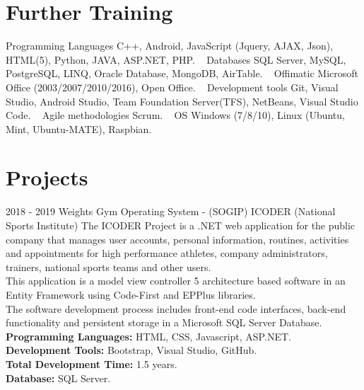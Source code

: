 \documentclass[]{friggeri-cv}
\begin{document}
\section{Further Training}
\begin{entrylist}
    \entry
    {}
    {Programming Languages}
    {}
    {C++, Android, JavaScript (Jquery, AJAX, Json), HTML(5), Python, JAVA, ASP.NET, PHP.}
    ~
    \entry
    {}
    {Databases}
    {}
    {SQL Server, MySQL, PostgreSQL, LINQ, Oracle Database, MongoDB, AirTable.}
    ~
    \entry
    {}
    {Offimatic}
    {}
    {Microsoft Office (2003/2007/2010/2016), Open Office.}
    ~
    \entry
    {}
    {Development tools}
    {}
    {Git, Visual Studio, Android Studio, Team Foundation Server(TFS), NetBeans, Visual Studio Code.}
    ~
    \entry
    {}
    {Agile methodologies}
    {}
    {Scrum.}
    ~
    \entry
    {}
    {OS}
    {}
    {Windows (7/8/10), Linux (Ubuntu, Mint, Ubuntu-MATE), Raspbian.}
    
\end{entrylist}

\section{Projects}
\begin{entrylist}
    \entry
    {2018 - 2019}
    {Weights Gym Operating System - (SOGIP)}
    {ICODER (National Sports Institute)}
    {The ICODER Project is a .NET web application for the public company that manages user accounts, personal information, routines, activities and appointments for high performance athletes, company administrators, trainers, national sports teams and other users. \\
    This application is a model view controller 5 architecture based software in an Entity Framework using Code-First and EPPlus libraries. \\
    The software development process includes front-end code interfaces, back-end functionality and persistent storage in a Microsoft SQL Server Database. \\
    \textbf{Programming Languages:} HTML, CSS, Javascript, ASP.NET. \\
    \textbf{Development Tools:} Bootstrap, Visual Studio, GitHub. \\
    \textbf{Total Development Time:} 1.5 years. \\
    \textbf{Database:} SQL Server. } \\
    
    
\end{entrylist}
\end{document}
